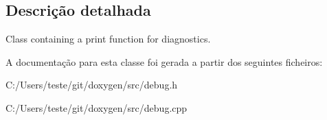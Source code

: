 \subsection{Descrição detalhada}
Class containing a print function for diagnostics. 

A documentação para esta classe foi gerada a partir dos seguintes ficheiros\-:\begin{DoxyCompactItemize}
\item 
C\-:/\-Users/teste/git/doxygen/src/debug.\-h\item 
C\-:/\-Users/teste/git/doxygen/src/debug.\-cpp\end{DoxyCompactItemize}
